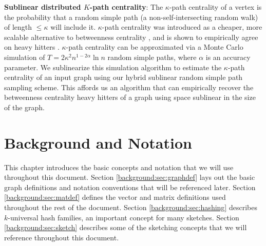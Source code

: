 \documentclass{report}
\begin{document}
%

\noindent
\textbf{Sublinear distributed $K$-path centrality}:
The $\kappa$-path centrality of a vertex is the probability that a random simple path (a non-self-intersecting random walk) of length $\leq \kappa$ will include it.
$\kappa$-path centrality was introduced as a cheaper, more scalable alternative to betweenness centrality \cite{alahakoon2011k}, and is shown to empirically agree on heavy hitters \cite{kourtellis2013identifying}.
$\kappa$-path centrality can be approximated via a Monte Carlo simulation of $T = 2 \kappa^2 n^{1-2\alpha} \ln n$ random simple paths, where $\alpha$ is an accuracy parameter. 
We sublinearize this simulation algorithm to estimate the $\kappa$-path centrality of an input graph using our hybrid sublinear random simple path sampling scheme. 
This affords us an algorithm that can empirically recover the betweenness centrality heavy hitters of a graph using space sublinear in the size of the graph.  





\chapter{Background and Notation} \label{chap:background}

This chapter introduces the basic concepts and notation that we will use throughout this document.
Section \ref{background:sec:graphdef} lays out the basic graph definitions and notation conventions that will be referenced later. 
Section \ref{background:sec:matdef} defines the vector and matrix definitions used throughout the rest of the document. 
Section \ref{background:sec:hashing} describes $k$-universal hash families, an important concept for many sketches.
Section \ref{background:sec:sketch} describes some of the sketching concepts that we will reference throughout this document.
\end{document}
